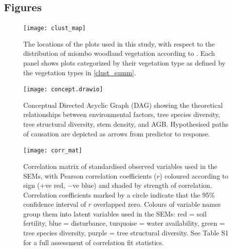 \documentclass[11pt,a4paper]{article}
\begin{document}
\begin{landscape}
\section{Figures}
\begin{figure}[H]
\centering
	\texttt{[image: clust\_map]}
	\caption{The locations of the \nplots{} plots used in this study, with respect to the distribution of miombo woodland vegetation according to \citet{White1987}. Each panel shows plots categorized by their vegetation type as defined by the vegetation types in \autoref{clust_summ}.}
	\label{clust_map}
\end{figure}
\end{landscape}
\newpage{}

\begin{figure}[H]
\centering
\texttt{[image: concept.drawio]}
	\caption{Conceptual Directed Acyclic Graph (DAG) showing the theoretical relationships between environmental factors, tree species diversity, tree structural diversity, stem density, and AGB. Hypothesised paths of causation are depicted as arrows from predictor to response.}
	\label{con_mod}
\end{figure}
\newpage{}

\begin{figure}[H]
\centering
	\texttt{[image: corr\_mat]}
	\caption{Correlation matrix of standardised observed variables used in the SEMs, with Pearson correlation coefficients ($r$) coloured according to sign ($+$ve red, $-$ve blue) and shaded by strength of correlation. Correlation coefficients marked by a circle indicate that the 95\% confidence interval of $r$ overlapped zero. Colours of variable names group them into latent variables used in the SEMs: red = soil fertility, blue = disturbance, turquoise = water availability, green = tree species diversity, purple = tree structural diversity. See Table S1 for a full assessment of correlation fit statistics.}
	\label{corr_mat}
\end{figure}
\newpage{}
\end{document}
